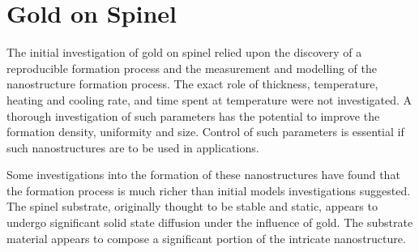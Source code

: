 \section{Gold on Spinel}
The initial investigation of gold on spinel relied upon the discovery of a reproducible formation process and the measurement and modelling of the nanostructure formation process. The exact role of thickness, temperature, heating and cooling rate, and time spent at temperature were not investigated. A thorough investigation of such parameters has the potential to improve the formation density, uniformity and size. Control of such parameters is essential if such nanostructures are to be used in applications.

Some investigations into the formation of these nanostructures have found that the formation process is much richer than initial models investigations suggested. The spinel substrate, originally thought to be stable and static, appears to undergo significant solid state diffusion under the influence of gold. The substrate material appears to compose a significant portion of the intricate nanostructure.
